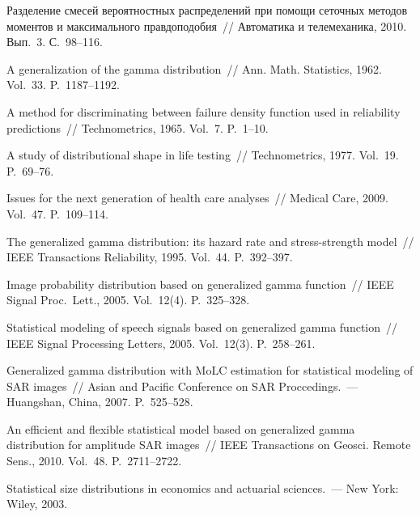 \begin{multicols}{2}
{{\begin{thebibliography}{99}
 Разделение смесей вероятностных
распределений при помощи сеточных методов моментов и максимального
правдоподобия~// Автоматика и телемеханика, 2010. Вып.~3. С.~98--116.

 A generalization of the gamma
distribution~// Ann. Math. Statistics, 1962. Vol.~33. P.~1187--1192.

 A method for discriminating
between failure density function used in reliability predictions~// 
Technometrics, 1965. Vol.~7. P.~1--10.

 A study of distributional
shape in life testing~// Technometrics, 1977. Vol.~19. P.~69--76.

Issues for the next generation
of health care analyses~// Medical Care, 2009. Vol.~47. P.~109--114.

 The generalized gamma
distribution: its hazard rate and stress-strength model~// IEEE
Transactions Reliability, 1995. Vol.~44. P.~392--397.

Image probability distribution based on generalized gamma function~// 
IEEE Signal Proc.\ Lett., 2005. Vol.~12(4). P.~325--328.


Statistical modeling of speech signals based on generalized gamma function~//
IEEE Signal Processing Letters, 2005. Vol.~12(3). P.~258--261.

 Generalized gamma
distribution with MoLC estimation for statistical modeling of SAR
images~// Asian and Pacific Conference on SAR Proccedings.~---
Huangshan, China, 2007. P.~525--528.

 An efficient
and flexible statistical model based on generalized gamma
distribution for amplitude SAR images~// IEEE Transactions on
Geosci. Remote Sens., 2010. Vol.~48. P.~2711--2722.

Statistical size distributions in economics and actuarial
sciences.~--- New York: Wiley, 2003.





\end{thebibliography}}}
\end{multicols}
